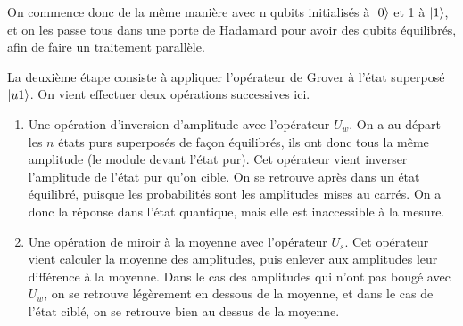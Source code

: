 On commence donc de la même manière avec n qubits initialisés à $\ket{0}$ et 1 à $\ket{1}$, et on les passe tous dans une porte de Hadamard pour avoir des qubits équilibrés, afin de faire un traitement parallèle.

La deuxième étape consiste à appliquer l'opérateur de Grover à l'état superposé $\ket{u1}$. On vient effectuer deux opérations successives ici.

\begin{enumerate}
  \item Une opération d'inversion d'amplitude avec l'opérateur $U_w$. On a au départ les $n$ états purs superposés de façon équilibrés, ils ont donc tous la même amplitude (le module devant l'état pur). Cet opérateur vient inverser l'amplitude de l'état pur qu'on cible. On se retrouve après dans un état équilibré, puisque les probabilités sont les amplitudes mises au carrés. On a donc la réponse dans l'état quantique, mais elle est inaccessible à la mesure.
  \item Une opération de miroir à la moyenne avec l'opérateur $U_s$. Cet opérateur vient calculer la moyenne des amplitudes, puis enlever aux amplitudes leur différence à la moyenne. Dans le cas des amplitudes qui n'ont pas bougé avec $U_w$, on se retrouve légèrement en dessous de la moyenne, et dans le cas de l'état ciblé, on se retrouve bien au dessus de la moyenne.
\end{enumerate}

